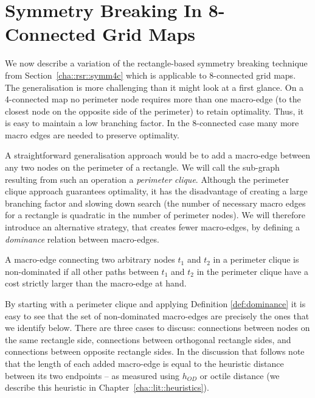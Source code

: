 \section{Symmetry Breaking In 8-Connected Grid Maps}
\label{cha::rsr::symm8c}
We now describe a variation of the rectangle-based symmetry breaking technique
from Section~\ref{cha::rsr::symm4c} which is applicable to 8-connected grid
maps.  The generalisation is more challenging than it might look at a first
glance.  On a 4-connected map no perimeter node requires more than one
macro-edge (to the closest node on the opposite side of the perimeter) to
retain optimality.  Thus, it is easy to maintain a low branching factor.  In
the 8-connected case many more macro edges are needed to preserve optimality.

A straightforward generalisation approach would be to add a macro-edge between
any two nodes on the perimeter of a rectangle.  We will call the sub-graph
resulting from such an operation a \emph{perimeter clique}.  Although the
perimeter clique approach guarantees optimality, it has the disadvantage of
creating a large branching factor and slowing down search (the number of
necessary macro edges for a rectangle is quadratic in the number of perimeter
nodes).  We will therefore introduce an alternative strategy, that creates
fewer macro-edges, by defining a \emph{dominance} relation between
macro-edges.

\begin{definition}
\label{def:dominance}
A macro-edge connecting two arbitrary nodes $t_1$ and $t_2$ in a perimeter
clique is non-dominated if all other paths between $t_1$ and $t_2$ in the
perimeter clique have a cost strictly larger than the macro-edge at hand.
\end{definition}

By starting with a perimeter clique and applying Definition
\ref{def:dominance} it is easy to see that the set of non-dominated
macro-edges are precisely the ones that we identify below.  There are three
cases to discuss: connections between nodes on the same rectangle side,
connections between orthogonal rectangle sides, and connections between
opposite rectangle sides.  In the discussion that follows note that the length
of each added macro-edge is equal to the heuristic distance between its two
endpoints -- as measured using $h_{OD}$ or octile distance 
(we describe this heuristic in Chapter~\ref{cha::lit::heuristics}).

